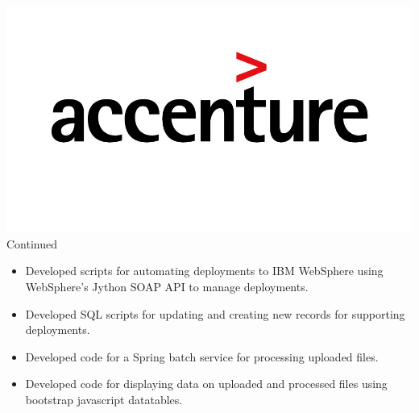 \documentclass[12pt, line, margin]{res}
\begin{document}
\begin{resume}
	      {\sl  \includegraphics[scale=0.1, trim=110 200 110 120]{resume_images/accenture-logo.jpg}} \hfill Continued\\
                 \begin{itemize}  \itemsep -2pt %
	      \item   Developed scripts for automating deployments to IBM WebSphere
			 using WebSphere’s Jython SOAP API to manage deployments.
	      \item   Developed SQL scripts for updating and creating new records
			 for supporting deployments.
	      \item   Developed code for a Spring batch service for processing
			 \newline uploaded files.
	      \item   Developed code for displaying data on uploaded and processed
			 files using bootstrap javascript datatables.
                \end{itemize}


\end{resume}
\end{document}
